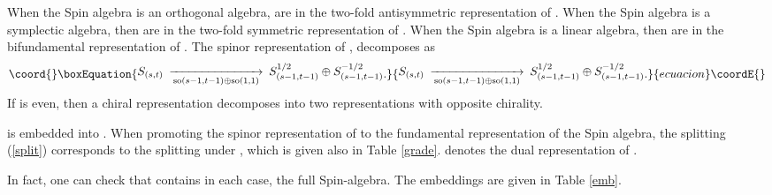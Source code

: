 \documentclass[a4paper,12pt]{article}
\begin{document}
When the Spin\coordHE{} algebra is an orthogonal algebra,
\coordHE{} are in the two-fold antisymmetric  representation of
\coordHE{}. When the Spin\coordHE{} algebra is a symplectic algebra,
then \coordHE{} are in the two-fold symmetric representation of
\coordHE{}. When the Spin\coordHE{} algebra is a linear algebra, then
\coordHE{} are in the bifundamental  representation of \coordHE{}.
\smallskip
The spinor representation of \coordHE{}, \coordHE{}
decomposes as \begin{equation}\coord{}\boxEquation{
\begin{CD}S_{(s,t)}@>>{\rm so}(s-1,t-1)\oplus{\rm
so}(1,1)>S_{(s-1,t-1)}^{1/2}\oplus
S_{(s-1,t-1)}^{-1/2}\end{CD}.\label{split}}{
\begin{CD}S_{(s,t)}@>>{\rm so}(s-1,t-1)\oplus{\rm
so}(1,1)>S_{(s-1,t-1)}^{1/2}\oplus
S_{(s-1,t-1)}^{-1/2}\end{CD}.}{ecuacion}\coordE{}\end{equation}  If \coordHE{}
is even, then a chiral representation decomposes into two
representations with opposite chirality.

\coordHE{} is embedded into  \coordHE{}. When promoting the
spinor representation of \coordHE{} to the fundamental
representation of the Spin\coordHE{} algebra, the splitting
(\ref{split}) corresponds to  the  splitting under \coordHE{}, which
is given also in Table \ref{grade}. \coordHE{} denotes the dual
representation of \coordHE{}.

In fact, one can check that \coordHE{} contains in each case, the
full Spin\coordHE{}-algebra. The embeddings are given in Table
\ref{emb}.
\end{document}
